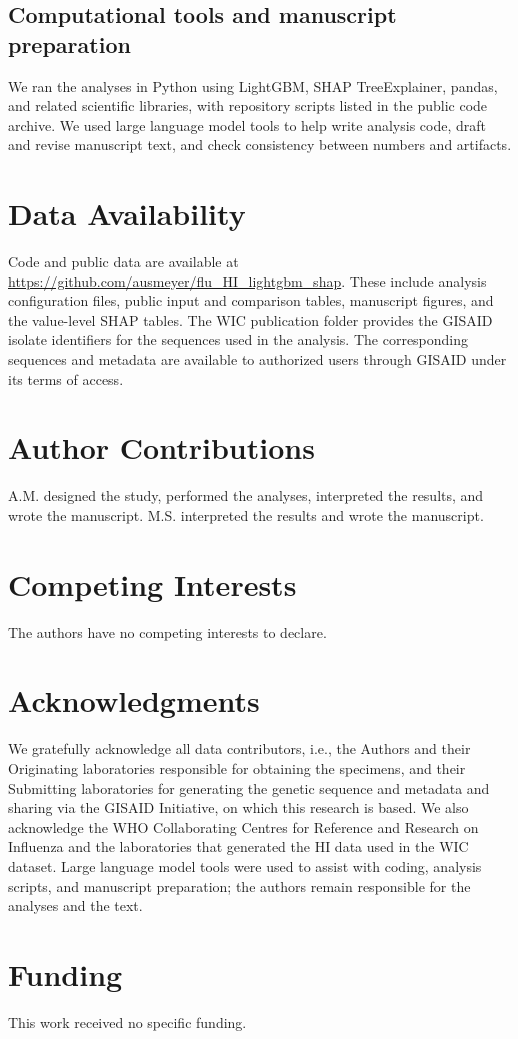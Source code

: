 \documentclass[12pt]{article}
\newcommand{\sectionstatement}[2]{%
  \section*{#1}
  #2
}
\begin{document}
\subsection{Computational tools and manuscript preparation}

We ran the analyses in Python using LightGBM, SHAP TreeExplainer, pandas, and related scientific libraries, with repository scripts listed in the public code archive. We used large language model tools to help write analysis code, draft and revise manuscript text, and check consistency between numbers and artifacts.

\sectionstatement{Data Availability}{Code and public data are available at \url{https://github.com/ausmeyer/flu_HI_lightgbm_shap}. These include analysis configuration files, public input and comparison tables, manuscript figures, and the value-level SHAP tables. The WIC publication folder provides the GISAID isolate identifiers for the sequences used in the analysis. The corresponding sequences and metadata are available to authorized users through GISAID under its terms of access.}

\sectionstatement{Author Contributions}{A.M. designed the study, performed the analyses, interpreted the results, and wrote the manuscript. M.S. interpreted the results and wrote the manuscript.}

\sectionstatement{Competing Interests}{The authors have no competing interests to declare.}

\sectionstatement{Acknowledgments}{We gratefully acknowledge all data contributors, i.e., the Authors and their Originating laboratories responsible for obtaining the specimens, and their Submitting laboratories for generating the genetic sequence and metadata and sharing via the GISAID Initiative, on which this research is based. We also acknowledge the WHO Collaborating Centres for Reference and Research on Influenza and the laboratories that generated the HI data used in the WIC dataset. Large language model tools were used to assist with coding, analysis scripts, and manuscript preparation; the authors remain responsible for the analyses and the text.}

\sectionstatement{Funding}{This work received no specific funding.}



\end{document}
